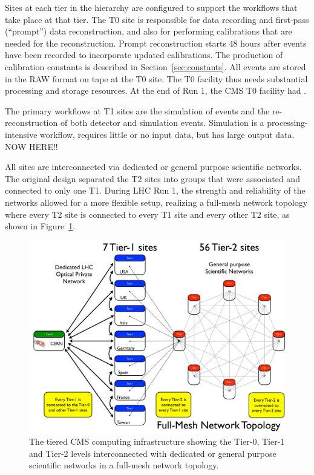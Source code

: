 Sites at each tier in the hierarchy are configured to support the workflows
that take place at that tier.  The T0 site is responsible for data
recording and first-pass (``prompt'') data reconstruction, and also for
performing calibrations that are needed for the reconstruction.  Prompt
reconstruction starts 48 hours after events have been recorded to
incorporate updated calibrations.  The production of calibration constants
is described in Section~\ref{sec:constants}.  All events are stored in the
RAW format on tape at the T0 site.    The T0 facility
thus needs substantial processing and storage resources.  At the end of Run
1, the CMS T0 facility had .

The primary workflows at T1 sites are the simulation of events and the
re-reconstruction of both detector and simulation events.  Simulation is a
processing-intensive workflow, requires little or no input data, but has
large output data.  NOW HERE!!

All sites are interconnected via
dedicated or general purpose scientific networks. The original design
separated the T2 sites into groups that were associated and connected
to only one T1. During LHC Run 1, the strength and reliability of the
networks allowed for a more flexible setup, realizing a full-mesh network
topology where every T2 site is connected to every T1 site and
every other T2 site, as shown in Figure~\ref{fig:distributed_topology}.

\begin{figure}
\begin{center}
\includegraphics[width=.5\textwidth]{figs/distributed_topology}
\end{center}
\caption{The tiered CMS computing infrastructure showing the Tier-0, Tier-1 and Tier-2 levels interconnected with dedicated or general purpose scientific networks in a full-mesh network topology.
  \label{fig:distributed_topology}}
\end{figure}

